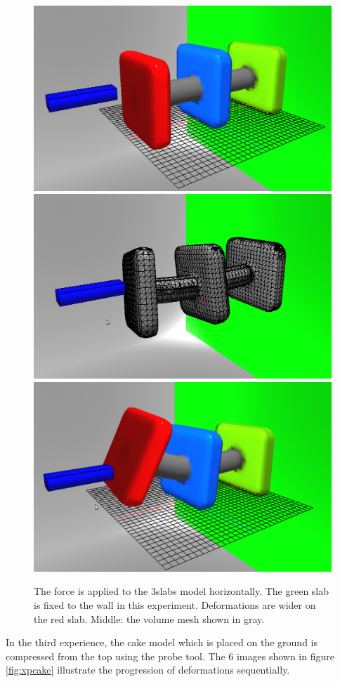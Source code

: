 \begin{figure}[H]
  \centering
  \includegraphics[width=0.30\linewidth]{figures/deformable/shots/3slabs01.png}
  \includegraphics[width=0.30\linewidth]{figures/deformable/shots/3slabs02.png}
  \includegraphics[width=0.30\linewidth]{figures/deformable/shots/3slabs03.png}
 
  \caption{\label{fig:xp3slabs}
  {The force is applied to the 3slabs model horizontally. The green slab is fixed to the wall in this experiment.
  Deformations are wider on the red slab. Middle: the volume mesh shown in gray.}
}
\end{figure}

In the third experience, the cake model which is placed on the ground is compressed from the top 
using the probe tool. The 6 images shown in figure \ref{fig:xpcake} illustrate the progression of deformations 
sequentially.

